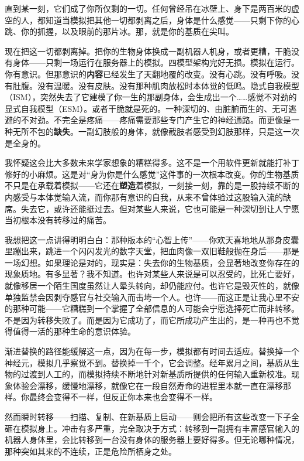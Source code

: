 \documentclass[11pt, twoside, openright]{book}
\begin{document}
直到某一刻，它们成了你所仅剩的一切。任何曾经吊在冰壁上、身下是两百米的虚空的人，都知道当模拟把其他一切都剥离之后，身体是什么感觉------只剩下你的心跳、你的抓握，以及眼前的那片冰。那，就是你的基质在尖叫。

现在把这一切都剥离掉。把你的生物身体换成一副机器人机身，或者更糟，干脆没有身体------只剩一场运行在服务器上的模拟。四模型架构完好无损。模拟在运行。你有意识。但那意识的\textbf{内容}已经发生了天翻地覆的改变。没有心跳。没有呼吸。没有肚腹。没有温暖。没有皮肤。没有那种肌肉放松时本体觉的低鸣。隐式自我模型（ISM），突然失去了它建模了你一生的那副身体，会生成出一个……感觉不对劲的显式自我模型（ESM）。或者干脆就是死的。一种深切的、由脏腑而生的、无可逃避的不对劲。不完全是疼痛------疼痛需要那些专门产生它的神经通路。而更像是一种无所不包的\textbf{缺失}。一副幻肢般的身体，就像截肢者感受到幻肢那样，只是这一次是全身的。

我怀疑这会比大多数未来学家想象的糟糕得多。这不是一个用软件更新就能打补丁修好的小麻烦。这是对“身为你是什么感觉”这件事的一次根本改变。你的生物基质不只是在承载着模拟------它还在\textbf{塑造}着模拟，一刻接一刻，靠的是一股持续不断的内感受与本体觉输入流，而你那有意识的自我，从来不曾体验过这股输入流的缺席。失去它，或许还能挺过去。但对某些人来说，它也可能是一种深切到让人宁愿当初根本没有转移过的痛苦。

我想把这一点讲得明明白白：那种版本的“心智上传”------你欢天喜地地从那身皮囊里蹦出来，跳进一个闪闪发光的数字天堂，把血肉像一双旧鞋般抛在身后------那是一场幻想。如果理论是对的，现实是：失去你的生物基质，会显著地改变你存在的现象质地。有多显著？我不知道。也许对某些人来说是可以忍受的，比死亡要好，就像移居一个陌生国度虽然让人晕头转向，却仍能应付。也许它是毁灭性的，就像单独监禁会因剥夺感官与社交输入而击垮一个人。也许------而这正是让我心里不安的那种可能------它糟糕到一个掌握了全部信息的人可能会宁愿选择死亡而非转移。不是因为转移失败了。而是因为它成功了，而它所成功产生出的，是一种再也不觉得值得一活的那种生命的意识体验。

渐进替换的路径能缓解这一点，因为在每一步，模拟都有时间去适应。替换掉一个神经元，模拟几乎察觉不到。替换掉一千个，它会调整。经年累月之间，基质从生物的过渡到人工的，而模拟持续不断地针对新基质所提供的任何输入重新校准。现象体验会漂移，缓慢地漂移，就像它在一段自然寿命的进程里本就一直在漂移那样。你最终会变得不一样，但反正你本来也会变得不一样。

然而瞬时转移------扫描、复制、在新基质上启动------则会把所有这些改变一下子全砸在模拟身上。冲击有多严重，完全取决于方式：转移到一副拥有丰富感官输入的机器人身体里，会比转移到一台没有身体的服务器上要好得多。但无论哪种情况，那种突如其来的不连续，正是危险所栖身之处。
\end{document}
